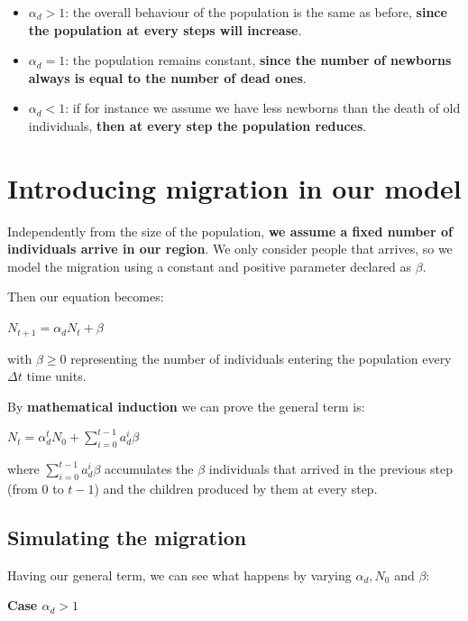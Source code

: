 \begin{itemize}

    \item $\alpha_{d} > 1$: the overall behaviour of the population is the same as before, \textbf{since the population at every steps will increase}.

    \item $\alpha_{d} = 1$: the population remains constant, \textbf{since the number of newborns always is equal to the number of dead ones}.

    \item $\alpha_{d} < 1$: if for instance we assume we have less newborns than the death of old individuals, \textbf{then at every step the population reduces}.
    
\end{itemize}

\section{Introducing migration in our model}
Independently from the size of the population, \textbf{we assume a fixed number of individuals arrive in our region}. We only consider people that arrives, so we model the migration using a constant and positive parameter declared as $\beta$. 
\par Then our equation becomes:

\begin{center}
    $N_{t+1} = \alpha_{d}N_{t} + \beta$
\end{center}

with $\beta \geq 0 $ representing the number of individuals entering the population every $\Delta{t}$ time units.

\par By \textbf{mathematical induction} we can prove the general term is:

\begin{center}
    $N_{t} = \alpha^{t}_{d}N_{0} + \sum_{i=0}^{t-1}{a^{i}_{d}\beta}$
\end{center}

where $\sum_{i=0}^{t-1}{a^{i}_{d}\beta}$ accumulates the $\beta$ individuals that arrived in the previous step (from 0 to $t-1$) and the children produced by them at every step.

\subsection{Simulating the migration}
Having our general term, we can see what happens by varying $\alpha_{d}, N_{0}$ and $ \beta:$
\par \textbf{Case $\alpha_{d} > 1$}

